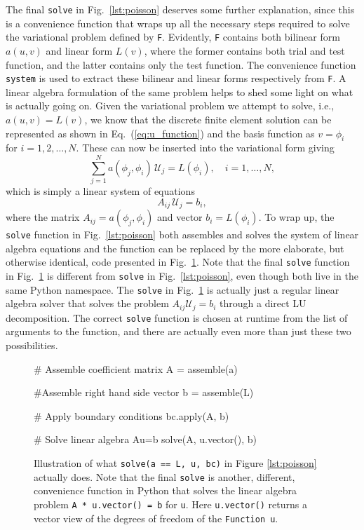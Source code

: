 \documentclass[final,3p,times,twocolumn]{elsarticle}
\newcommand{\inpyth}{\lstinline[style=inlinestyle]} %[]%
\begin{document}
The final \inpyth{solve}{} in Fig.~\ref{lst:poisson} deserves some further explanation, since this is a convenience function that wraps up all the necessary steps required to solve the variational problem defined by \inpyth{F}. Evidently, \inpyth{F} contains both bilinear form $a(u, v)$ and linear form $L(v)$, where the former contains both trial and test function, and the latter contains only the test function. The convenience function \inpyth{system}{} is used to extract these bilinear and linear forms respectively from \inpyth{F}{}. A linear algebra formulation of the same problem helps to shed some light on what is actually going on. Given the variational problem we attempt to solve, i.e., $a(u, v) = L(v)$, we know that the discrete finite element solution can be represented as shown in Eq.~(\ref{eq:u_function}) and the basis function as $v= \phi_i$ for $i=1,2,\ldots, N$. These can now be inserted into the variational form giving
\begin{equation}
  \sum_{j=1}^N a(\phi_j, \phi_i)\, \mathcal{U}_j = L(\phi_i), \quad i=1,\ldots, N,
\end{equation}
which is simply a linear system of equations
\begin{equation}
  A_{ij}\, \mathcal{U}_j = b_i,
  \label{eq:Aij=bi}
\end{equation}
where the matrix $A_{ij} = a(\phi_j, \phi_i)$ and vector $b_i = L(\phi_i)$. To wrap up, the \inpyth{solve}{} function in Fig.~\ref{lst:poisson} both assembles and solves the system of linear algebra equations and the function can be replaced by the more elaborate, but otherwise identical, code presented in Fig.~\ref{lst:solve-explained}. Note that the final \inpyth{solve}{} function in Fig.~\ref{lst:solve-explained} is different from \inpyth{solve}{} in Fig.~\ref{lst:poisson}, even though both live in the same Python namespace. The \inpyth{solve}{} in Fig.~\ref{lst:solve-explained} is actually just a regular linear algebra solver that solves the problem $A_{ij} \mathcal{U}_j = b_i$ through a direct LU decomposition. The correct \inpyth{solve}{} function is chosen at runtime from the list of arguments to the function, and there are actually even more than just these two possibilities.
\begin{figure}[ht!]
\begin{python}
# Assemble coefficient matrix
A = assemble(a)

#Assemble right hand side vector
b = assemble(L)

# Apply boundary conditions
bc.apply(A, b)

# Solve linear algebra Au=b
solve(A, u.vector(), b)
\end{python}
\caption{Illustration of what \inpyth{solve(a == L, u, bc)} in Figure \ref{lst:poisson} actually does. Note that the final \inpyth{solve} is another, different,  convenience function in Python that solves the linear algebra problem \inpyth{A * u.vector() = b} for \inpyth{u}. Here \inpyth{u.vector()} returns a vector view of the degrees of freedom of the \inpyth{Function u}.}
\label{lst:solve-explained}
\end{figure}
\end{document}
